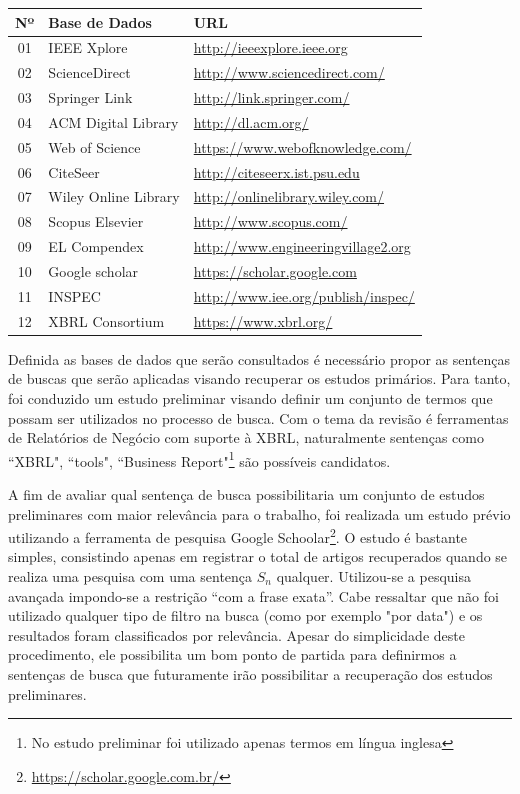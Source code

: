 \documentclass{article}
\begin{document}
\begin{center}
\begin{tabular}{cll}
\label{tab:base-dados}
 Nº&Base de Dados&URL\\
\hline
01 & IEEE Xplore  & \url{http://ieeexplore.ieee.org}\\
02 & ScienceDirect  & \url{http://www.sciencedirect.com/}\\
03 & Springer Link & \url{http://link.springer.com/}\\
04 & ACM Digital Library & \url{http://dl.acm.org/}\\
05 & Web of Science & \url{https://www.webofknowledge.com/}\\
06 & CiteSeer & \url{http://citeseerx.ist.psu.edu}\\
07 & Wiley Online Library & \url{http://onlinelibrary.wiley.com/}\\
08 & Scopus Elsevier & \url{http://www.scopus.com/}\\
09 & EL Compendex & \url{http://www.engineeringvillage2.org}\\
10 & Google scholar & \url{https://scholar.google.com}\\
11 &INSPEC  & \url{http://www.iee.org/publish/inspec/}\\
12 &XBRL Consortium & \url{https://www.xbrl.org/}\\
\end{tabular}
\end{center}


Definida as bases de dados que serão consultados é necessário propor as sentenças de buscas que serão aplicadas visando recuperar os estudos primários. Para tanto, foi conduzido um estudo preliminar visando definir um conjunto de termos que possam ser utilizados no processo de busca. Com o tema da revisão é ferramentas de Relatórios de Negócio com suporte à XBRL, naturalmente sentenças como ``XBRL", ``tools", ``Business Report"\footnote{No estudo preliminar foi utilizado apenas termos em língua inglesa} são possíveis candidatos.

A fim de avaliar qual sentença de busca possibilitaria um conjunto de estudos
preliminares com maior relevância para o trabalho, foi realizada um estudo
prévio utilizando a ferramenta de pesquisa Google
Schoolar\footnote{\url{https://scholar.google.com.br/}}. O estudo é bastante
simples, consistindo apenas em registrar o total de artigos recuperados quando
se realiza uma pesquisa com uma sentença $S_n$ qualquer. Utilizou-se a pesquisa
avançada impondo-se a restrição ``com a frase exata''. Cabe ressaltar que não foi utilizado qualquer tipo de filtro na busca (como por exemplo "por data") e os resultados foram classificados por relevância. Apesar do simplicidade deste procedimento, ele possibilita um bom ponto de partida para definirmos a sentenças de busca que futuramente irão possibilitar a recuperação dos estudos preliminares.
\end{document}
